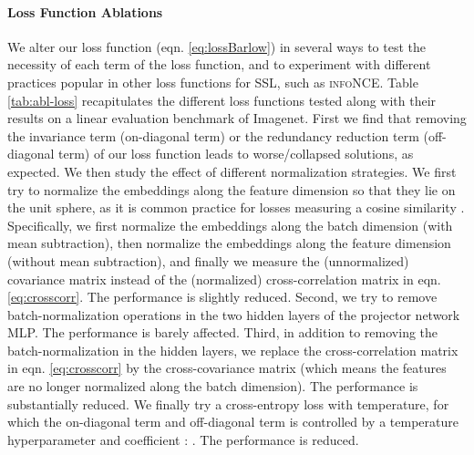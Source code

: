 \documentclass{article}
\begin{document}
\paragraph{Loss Function Ablations} 
We alter our loss function (eqn. \ref{eq:lossBarlow}) in several ways to test the necessity of each term of the loss function, and to experiment with different practices popular in other loss functions for SSL, such as \textsc{infoNCE}.  Table \ref{tab:abl-loss} recapitulates the different loss functions tested along with their results on a linear evaluation benchmark of Imagenet. First we find that removing the invariance term (on-diagonal term) or the redundancy reduction term (off-diagonal term) of our loss function leads to worse/collapsed solutions, as expected. We then study the effect of different normalization strategies. We first try to normalize the embeddings along the feature dimension so that they lie on the unit sphere, as it is common practice for losses measuring a cosine similarity \cite{chen2020simple,grill2020bootstrap,wang_understanding_2020}. Specifically, we first normalize the embeddings along the batch dimension (with mean subtraction), then normalize the embeddings along the feature dimension (without mean subtraction), and finally we measure the (unnormalized) covariance matrix instead of the (normalized) cross-correlation matrix in eqn. \ref{eq:crosscorr}. The performance is slightly reduced. Second, we try to remove batch-normalization operations in the two hidden layers of the projector network MLP. The performance is barely affected. Third, in addition to removing the batch-normalization in the hidden layers, we replace the cross-correlation matrix in eqn. \ref{eq:crosscorr} by the cross-covariance matrix (which means the features are no longer normalized along the batch dimension). The performance is substantially reduced. We finally try a cross-entropy loss with temperature, for which the on-diagonal term and off-diagonal term is controlled by a temperature hyperparameter  and coefficient : 
. The performance is reduced.
\end{document}
